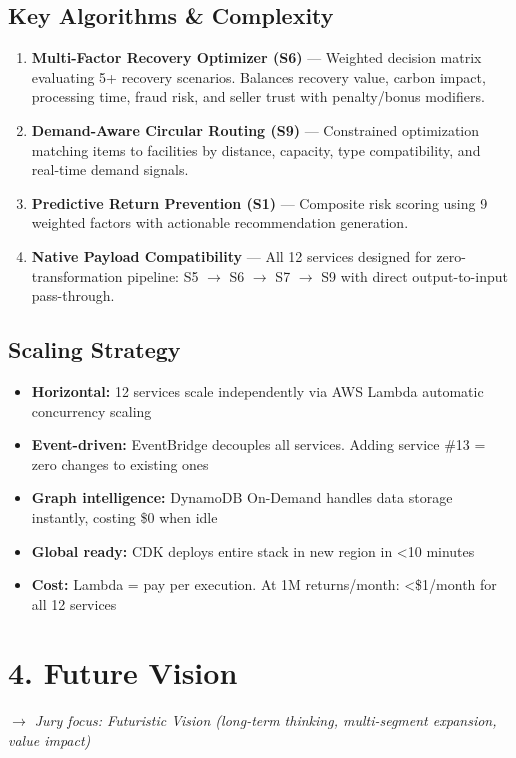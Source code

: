 \documentclass[11pt,a4paper]{article}
\begin{document}
\subsection{Key Algorithms \& Complexity}
\begin{enumerate}[noitemsep]
\item \textbf{Multi-Factor Recovery Optimizer (S6)} --- Weighted decision matrix evaluating 5+ recovery scenarios. Balances recovery value, carbon impact, processing time, fraud risk, and seller trust with penalty/bonus modifiers.
\item \textbf{Demand-Aware Circular Routing (S9)} --- Constrained optimization matching items to facilities by distance, capacity, type compatibility, and real-time demand signals.
\item \textbf{Predictive Return Prevention (S1)} --- Composite risk scoring using 9 weighted factors with actionable recommendation generation.
\item \textbf{Native Payload Compatibility} --- All 12 services designed for zero-transformation pipeline: S5 $\rightarrow$ S6 $\rightarrow$ S7 $\rightarrow$ S9 with direct output-to-input pass-through.
\end{enumerate}

\subsection{Scaling Strategy}
\begin{itemize}[noitemsep]
\item \textbf{Horizontal:} 12 services scale independently via AWS Lambda automatic concurrency scaling
\item \textbf{Event-driven:} EventBridge decouples all services. Adding service \#13 = zero changes to existing ones
\item \textbf{Graph intelligence:} DynamoDB On-Demand handles data storage instantly, costing \$0 when idle
\item \textbf{Global ready:} CDK deploys entire stack in new region in <10 minutes
\item \textbf{Cost:} Lambda = pay per execution. At 1M returns/month: <\$1/month for all 12 services
\end{itemize}

\newpage

\section{4. Future Vision}
{\small\itshape $\rightarrow$ Jury focus: Futuristic Vision (long-term thinking, multi-segment expansion, value impact)}
\end{document}
